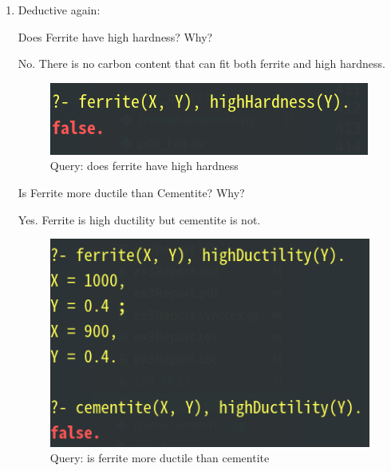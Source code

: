 \documentclass[12pt]{article}
\begin{document}
{\begin{enumerate}[1.]
\begin{figure}[ht]
{\begin{minipage}{7cm}
			\end{minipage}
		}
		\caption{Query: are materials solid or liquid}
		\label{fig:label12}
	\end{figure}

	\item Deductive again:
	
	Does Ferrite have high hardness? Why?

	No. There is no carbon content that can fit both ferrite and high hardness.

	\begin{figure}[ht]
		\centering
		\includegraphics[scale=0.3]{figs/ex9-3-1.png}
		\caption{Query: does ferrite have high hardness}
		\label{fig:label13}
	\end{figure}

	Is Ferrite more ductile than Cementite? Why?

	Yes. Ferrite is high ductility but cementite is not.

	\begin{figure}[ht]
		\centering
		\includegraphics[scale=0.3]{figs/ex9-3-2.png}
		\caption{Query: is ferrite more ductile than cementite}
		\label{fig:label14}
	\end{figure}


\end{enumerate}}
\end{document}
